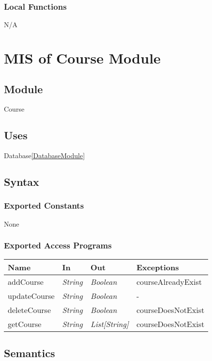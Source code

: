 \documentclass[12pt, titlepage]{article}
\begin{document}
\subsubsection{Local Functions}
N/A


\newpage
\section{MIS of Course Module} \label{CourseModule}

\subsection{Module}
Course

\subsection{Uses}
Database\ref{DatabaseModule}
\
\subsection{Syntax}

\subsubsection{Exported Constants}
None

\subsubsection{Exported Access Programs}

\begin{center}
\begin{tabular}{p{4cm} p{3cm} p{3cm} p{3cm}}
\hline
\textbf{Name} & \textbf{In} & \textbf{Out} & \textbf{Exceptions} \\
\hline
addCourse&  \textit{String} & \textit{Boolean} & courseAlreadyExist \\
updateCourse&  \textit{String} & \textit{Boolean} & - \\
deleteCourse&  \textit{String} & \textit{Boolean} & courseDoesNotExist \\
getCourse&  \textit{String} & \textit{List[String]} & courseDoesNotExist \\

\hline
\end{tabular}
\end{center}

\subsection{Semantics}
\end{document}
